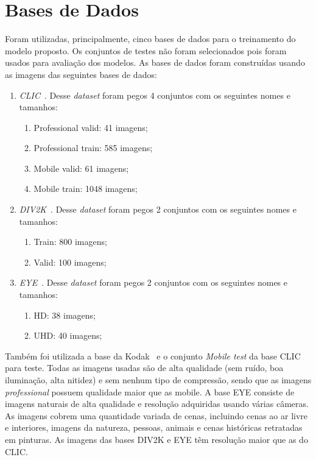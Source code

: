 \section{Bases de Dados}%
Foram utilizadas, principalmente, cinco bases de dados para o treinamento do modelo proposto. Os conjuntos de testes não foram selecionados pois foram usados para avaliação dos modelos. As bases de dados foram construídas usando as imagens das seguintes bases de dados:
\begin{enumerate}
    \item \emph{\acrshort{CLIC}}~\cite{clic}. Desse \textit{dataset} foram pegos 4 conjuntos com os seguintes nomes e tamanhos:
    \begin{enumerate}
        \item Professional valid: 41 imagens;
        \item Professional train: 585 imagens;
        \item Mobile valid: 61 imagens;
        \item Mobile train: 1048 imagens;
    \end{enumerate}
    \item \emph{\acrshort{DIV2K}}~\cite{div2k}. Desse \textit{dataset} foram pegos 2 conjuntos com os seguintes nomes e tamanhos:
    \begin{enumerate}
        \item Train: 800 imagens;
        \item Valid: 100 imagens;
    \end{enumerate}
    \item \emph{\acrshort{EYE}}~\cite{ultra_eye}. Desse \textit{dataset} foram pegos 2 conjuntos com os seguintes nomes e tamanhos:
    \begin{enumerate}
        \item HD: 38 imagens;
        \item UHD: 40 imagens;
    \end{enumerate}
\end{enumerate}
Também foi utilizada a base da Kodak~\cite{kodak} e o conjunto \textit{Mobile test} da base \acrshort{CLIC} para teste. Todas as imagens usadas são de alta qualidade (sem ruído, boa iluminação, alta nitidez) e sem nenhum tipo de compressão, sendo que as imagens \textit{professional} possuem qualidade maior que as {mobile}. A base \acrshort{EYE} consiste de imagens naturais de alta qualidade e resolução adquiridas usando várias câmeras. As imagens cobrem uma quantidade variada de cenas, incluindo cenas ao ar livre e interiores, imagens da natureza, pessoas, animais e cenas históricas retratadas em pinturas. As imagens das bases \acrshort{DIV2K} e \acrshort{EYE} têm resolução maior que as do \acrshort{CLIC}.

